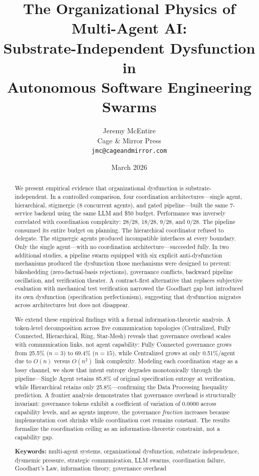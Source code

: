 \documentclass[11pt,a4paper]{article}
\title{The Organizational Physics of Multi-Agent AI:\\
Substrate-Independent Dysfunction in\\
Autonomous Software Engineering Swarms}
\author{Jeremy McEntire\\
Cage \& Mirror Press\\
\texttt{jmc@cageandmirror.com}}
\date{March 2026}
\begin{document}
\maketitle

\begin{abstract}
We present empirical evidence that organizational dysfunction is substrate-independent. In a controlled comparison, four coordination architectures---single agent, hierarchical, stigmergic (8 concurrent agents), and gated pipeline---built the same 7-service backend using the same LLM and \$50 budget. Performance was inversely correlated with coordination complexity: 28/28, 18/28, 9/28, and 0/28. The pipeline consumed its entire budget on planning. The hierarchical coordinator refused to delegate. The stigmergic agents produced incompatible interfaces at every boundary. Only the single agent---with no coordination architecture---succeeded fully. In two additional studies, a pipeline swarm equipped with six explicit anti-dysfunction mechanisms produced the dysfunction those mechanisms were designed to prevent: bikeshedding (zero-factual-basis rejections), governance conflicts, backward pipeline oscillation, and verification theater. A contract-first alternative that replaces subjective evaluation with mechanical test verification narrowed the Goodhart gap but introduced its own dysfunction (specification perfectionism), suggesting that dysfunction migrates across architectures but does not disappear.

We extend these empirical findings with a formal information-theoretic analysis. A token-level decomposition across five communication topologies (Centralized, Fully Connected, Hierarchical, Ring, Star-Mesh) reveals that governance overhead scales with communication links, not agent capability: Fully Connected governance grows from 25.5\% ($n=3$) to 69.4\% ($n=15$), while Centralized grows at only 0.51\%/agent due to $O(n)$ versus $O(n^2)$ link complexity. Modeling each coordination stage as a lossy channel, we show that intent entropy degrades monotonically through the pipeline---Single Agent retains 85.8\% of original specification entropy at verification, while Hierarchical retains only 25.8\%---confirming the Data Processing Inequality prediction. A frontier analysis demonstrates that governance overhead is structurally invariant: governance tokens exhibit a coefficient of variation of 0.0000 across capability levels, and as agents improve, the governance \emph{fraction} increases because implementation cost shrinks while coordination cost remains constant. The results formalize the coordination ceiling as an information-theoretic constraint, not a capability gap.

\medskip
\noindent\textbf{Keywords:} multi-agent systems, organizational dysfunction, substrate independence, dysmemic pressure, strategic communication, LLM swarms, coordination failure, Goodhart's Law, information theory, governance overhead
\end{abstract}
\end{document}
